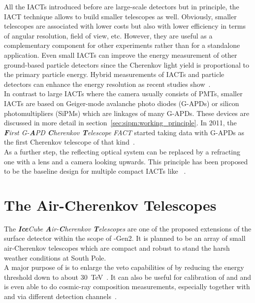 All the IACTs introduced before are large-scale detectors but in principle, the IACT technique allows to build smaller telescopes as well. Obviously, smaller telescopes are associated with lower costs but also with lower efficiency in terms of angular resolution, field of view, etc. However, they are useful as a complementary component for other experiments rather than for a standalone application. Even small IACTs can improve the energy measurement of other ground-based particle detectors since the Cherenkov light yield is proportional to the primary particle energy. Hybrid measurements of IACTs and particle detectors can enhance the energy resolution as recent studies show~\cite{iacts:extension}.\\

In contrast to large IACTs where the camera usually consists of PMTs, smaller IACTs are based on Geiger-mode avalanche photo diodes (G-APDs) or silicon photomultipliers (SiPMs) which are linkages of many G-APDs. These devices are discussed in more detail in section~\ref{sec:sipm:working_principle}. In 2011, the \textit{\textbf{F}irst G-\textbf{A}PD \textbf{C}herenkov \textbf{T}elescope} \textit{FACT} started taking data with G-APDs as the first Cherenkov telescope of that kind~\cite{iacts:fact}.\\

As a further step, the reflecting optical system can be replaced by a refracting one with a lens and a camera looking upwards. This principle has been proposed to be the baseline design for multiple compact IACTs like \iceact~\cite{icecube:iceact}.

\section{The \icecube Air-Cherenkov Telescopes \iceact}\label{sec:iceact_intro}

The \textit{\textbf{Ice}Cube \textbf{A}ir-\textbf{C}herenkov \textbf{T}elescopes} \textit{\iceact} are one of the proposed extensions of the surface detector \icetop within the scope of \icecube-Gen2. It is planned to be an array of small air-Cherenkov telescopes which are compact and robust to stand the harsh weather conditions at South Pole.\\

A major purpose of \iceact is to enlarge the veto capabilities of \icetop by reducing the energy threshold down to about \SI{30}{\tera\electronvolt}~\cite{icecube:iceact}. It can also be useful for calibration of \icecube and \icetop and is even able to do cosmic-ray composition measurements, especially together with \icecube and \icetop via different detection channels~\cite{iceact:composition}.\\

